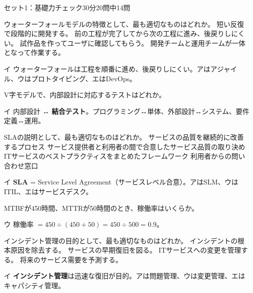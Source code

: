 \begin{mogishi}{セット1：基礎力チェック}{30分}{20問中14問}
\begin{itpmon}[\diffbadge{標}]{ウォーターフォールモデルの特徴として、最も適切なものはどれか。}
\sentakushi
  {短い反復で段階的に開発する。}
  {前の工程が完了してから次の工程に進み、後戻りしにくい。}
  {試作品を作ってユーザに確認してもらう。}
  {開発チームと運用チームが一体となって作業する。}
\end{itpmon}
\begin{kaisetsu}{イ}
ウォーターフォールは工程を順番に進め、後戻りしにくい。アはアジャイル、ウはプロトタイピング、エはDevOps。
\end{kaisetsu}

\begin{itpmon}[\diffbadge{基}]{V字モデルで、内部設計に対応するテストはどれか。}
\end{itpmon}
\begin{kaisetsu}{イ}
内部設計 ↔ \textbf{結合テスト}。プログラミング↔単体、外部設計↔システム、要件定義↔運用。
\end{kaisetsu}

\begin{itpmon}[\diffbadge{標}]{SLAの説明として、最も適切なものはどれか。}
\sentakushi
  {サービスの品質を継続的に改善するプロセス}
  {サービス提供者と利用者の間で合意したサービス品質の取り決め}
  {ITサービスのベストプラクティスをまとめたフレームワーク}
  {利用者からの問い合わせ窓口}
\end{itpmon}
\begin{kaisetsu}{イ}
\textbf{SLA} = Service Level Agreement（サービスレベル合意）。アはSLM、ウはITIL、エはサービスデスク。
\end{kaisetsu}

\begin{itpmon}[\diffbadge{標}]{MTBFが450時間、MTTRが50時間のとき、稼働率はいくらか。}
\end{itpmon}
\begin{kaisetsu}{ウ}
稼働率 $= 450 \div (450 + 50) = 450 \div 500 = 0.9$。
\end{kaisetsu}

\begin{itpmon}[\diffbadge{基}]{インシデント管理の目的として、最も適切なものはどれか。}
\sentakushi
  {インシデントの根本原因を除去する。}
  {サービスの早期復旧を図る。}
  {ITサービスへの変更を管理する。}
  {将来のサービス需要を予測する。}
\end{itpmon}
\begin{kaisetsu}{イ}
\textbf{インシデント管理}は迅速な復旧が目的。アは問題管理、ウは変更管理、エはキャパシティ管理。
\end{kaisetsu}


\end{mogishi}

